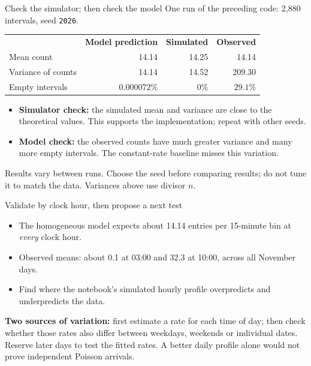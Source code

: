 \documentclass{beamer}
\begin{document}
\begin{frame}{Check the simulator; then check the model}
  \small
  One run of the preceding code: 2,880 intervals, seed \texttt{2026}.
  \vspace{0.5em}

  \begin{tabular}{@{}lrrr@{}}
    & \textbf{Model prediction} & \textbf{Simulated} & \textbf{Observed}\\[0.35em]
    Mean count & 14.14 & 14.25 & 14.14\\[0.35em]
    Variance of counts & 14.14 & 14.52 & 209.30\\[0.35em]
    Empty intervals & $0.000072\%$ & $0\%$ & $29.1\%$\\
  \end{tabular}
  \vspace{0.6em}
  \begin{itemize}
    \item \textbf{Simulator check:} the simulated mean and variance are close to the theoretical values. This supports the implementation; repeat with other seeds.
    \item \textbf{Model check:} the observed counts have much greater variance and many more empty intervals. The constant-rate baseline misses this variation.
  \end{itemize}
  \vspace{0.3em}
  Results vary between runs. Choose the seed before comparing results; do not tune it to match the data. Variances above use divisor $n$.
\end{frame}

\begin{frame}{Validate by clock hour, then propose a next test}
  \begin{itemize}
    \item The homogeneous model expects about 14.14 entries per 15-minute bin at \emph{every} clock hour.
    \item Observed means: about 0.1 at 03:00 and 32.3 at 10:00, across all November days.
    \item Find where the notebook's simulated hourly profile overpredicts and underpredicts the data.
  \end{itemize}
  \vspace{0.5em}
  \textbf{Two sources of variation:} first estimate a rate for each time of day; then check whether those rates also differ between weekdays, weekends or individual dates. Reserve later days to test the fitted rates. A better daily profile alone would not prove independent Poisson arrivals.
\end{frame}
\end{document}
